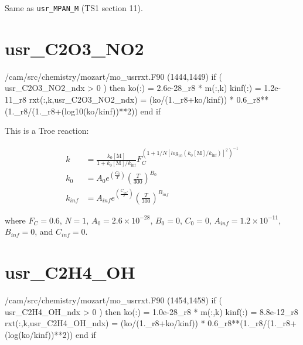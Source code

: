 \documentclass[titlepage]{article}
\begin{document}
Same as \verb>usr_MPAN_M> (TS1 section 11).


\section{usr\_C2O3\_NO2}

\begin{blockcode}[commandchars=\\\{\}]
\color{gray}/cam/src/chemistry/mozart/mo_usrrxt.F90 (1444,1449)
       if ( usr_C2O3_NO2_ndx > 0 ) then
          ko(:)   = 2.6e-28_r8 * m(:,k)
          kinf(:) = 1.2e-11_r8
          rxt(:,k,usr_C2O3_NO2_ndx) = (ko/(1._r8+ko/kinf)) * 0.6_r8**(1._r8/(1._r8+(log10(ko/kinf))**2))
       end if
\end{blockcode}  

This is a Troe reaction:

\begin{equation}
\begin{split}
k & = \frac{k_0[\mbox{M}]}{1+k_0[\mbox{M}]/k_{\inf}}F_C^{(1+1/N[log_{10}(k_0[\mbox{M}]/k_{\inf})]^2)^{-1}} \\
k_0 & = A_0 e^{\left( \frac{C_0}{T} \right)} \left( \frac{T}{300} \right)^{B_0} \\
k_{inf} & = A_{inf} e^{\left( \frac{C_{inf}}{T} \right)} \left( \frac{T}{300} \right)^{B_{inf}}
\end{split}
\end{equation}

\noindent where $F_C = 0.6$, $N = 1$, $A_0 = 2.6 \times 10^{-28}$, $B_0 = 0$, $C_0 = 0$, $A_{inf} = 1.2 \times 10^{-11}$, $B_{inf} = 0$, and $C_{inf} = 0$.



\section{usr\_C2H4\_OH}

\begin{blockcode}[commandchars=\\\{\}]
\color{gray}/cam/src/chemistry/mozart/mo_usrrxt.F90 (1454,1458)
       if ( usr_C2H4_OH_ndx > 0 ) then
          ko(:)   = 1.0e-28_r8 * m(:,k)
          kinf(:) = 8.8e-12_r8
          rxt(:,k,usr_C2H4_OH_ndx) = (ko/(1._r8+ko/kinf)) * 0.6_r8**(1._r8/(1._r8+(log(ko/kinf))**2))
       end if
\end{blockcode}  
\end{document}
